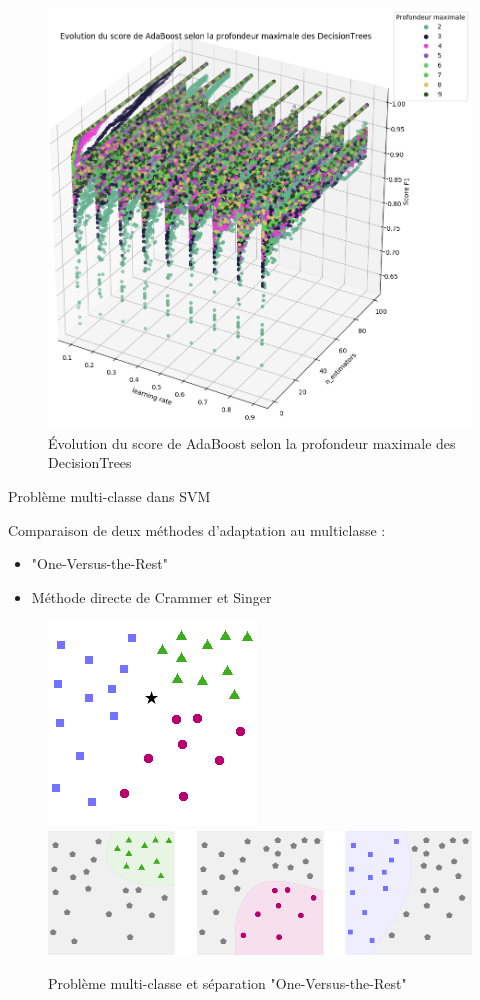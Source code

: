 \documentclass[usenames,dvipsnames]{beamer}
\begin{document}
\begin{frame}
\begin{figure}
\centering
\includegraphics[width=.56\textwidth]{img/adaboost_depth.png}
\caption{Évolution du score de AdaBoost selon la profondeur maximale des DecisionTrees}
\end{figure}
\end{frame}


\begin{frame}{Problème multi-classe dans SVM}

Comparaison de deux méthodes d'adaptation au multiclasse :

\begin{itemize}
\item "One-Versus-the-Rest"
\item Méthode directe de Crammer et Singer
\end{itemize}

\begin{figure}
\centering
\includegraphics[scale=0.4]{img/svm.png} \hspace{2pt}
\includegraphics[scale=0.4]{img/svm_OneVsAll.png}
\caption{Problème multi-classe et séparation "One-Versus-the-Rest"\label{fig:one_versus_rest}}
\end{figure}

\end{frame}
\end{document}
